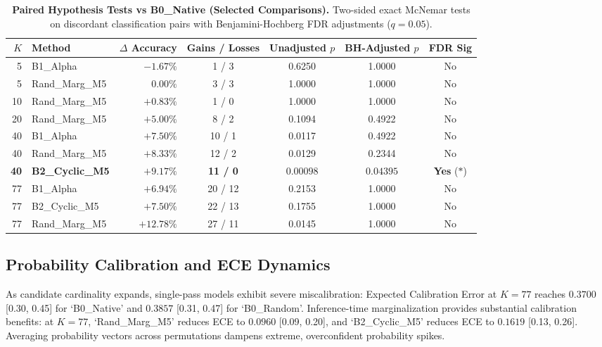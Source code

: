 \documentclass[11pt,a4paper]{article}
\begin{document}
\begin{table}[H]
\centering
\small
\caption{\textbf{Paired Hypothesis Tests vs B0\_Native (Selected Comparisons).} Two-sided exact McNemar tests on discordant classification pairs with Benjamini-Hochberg FDR adjustments ($q=0.05$).}
\label{tab:significance_summary}
\begin{tabular}{r l r c c c c}
\toprule
$K$ & Method & $\Delta$ Accuracy & Gains / Losses & Unadjusted $p$ & BH-Adjusted $p$ & FDR Sig \\
\midrule
5  & B1\_Alpha     & $-1.67\%$ & 1 / 3  & 0.6250   & 1.0000 & No \\
5  & Rand\_Marg\_M5 & $0.00\%$  & 3 / 3  & 1.0000   & 1.0000 & No \\
10 & Rand\_Marg\_M5 & $+0.83\%$ & 1 / 0  & 1.0000   & 1.0000 & No \\
20 & Rand\_Marg\_M5 & $+5.00\%$ & 8 / 2  & 0.1094   & 0.4922 & No \\
40 & B1\_Alpha     & $+7.50\%$ & 10 / 1 & 0.0117   & 0.4922 & No \\
40 & Rand\_Marg\_M5 & $+8.33\%$ & 12 / 2 & 0.0129   & 0.2344 & No \\
\textbf{40} & \textbf{B2\_Cyclic\_M5} & $\mathbf{+9.17\%}$ & \textbf{11 / 0} & $\mathbf{0.00098}$ & $\mathbf{0.04395}$ & \textbf{Yes} ($*$) \\
77 & B1\_Alpha     & $+6.94\%$ & 20 / 12 & 0.2153   & 1.0000 & No \\
77 & B2\_Cyclic\_M5 & $+7.50\%$ & 22 / 13 & 0.1755   & 1.0000 & No \\
77 & Rand\_Marg\_M5 & $+12.78\%$ & 27 / 11 & 0.0145   & 1.0000 & No \\
\bottomrule
\end{tabular}
\end{table}

\subsection{Probability Calibration and ECE Dynamics}

As candidate cardinality expands, single-pass models exhibit severe miscalibration: Expected Calibration Error at $K=77$ reaches $0.3700$ [0.30, 0.45] for `B0\_Native' and $0.3857$ [0.31, 0.47] for `B0\_Random'. Inference-time marginalization provides substantial calibration benefits: at $K=77$, `Rand\_Marg\_M5' reduces ECE to $0.0960$ [0.09, 0.20], and `B2\_Cyclic\_M5' reduces ECE to $0.1619$ [0.13, 0.26]. Averaging probability vectors across permutations dampens extreme, overconfident probability spikes.
\end{document}
